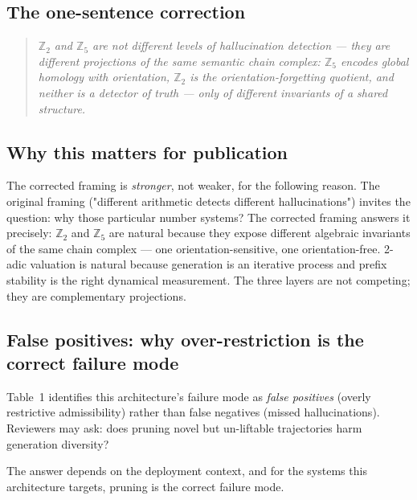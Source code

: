 \documentclass[11pt,a4paper]{article}
\begin{document}
\subsection*{The one-sentence correction}

\begin{quote}
\emph{$\mathbb{Z}_2$ and $\mathbb{Z}_5$ are not different levels of
hallucination detection --- they are different projections of the same
semantic chain complex: $\mathbb{Z}_5$ encodes global homology with
orientation, $\mathbb{Z}_2$ is the orientation-forgetting quotient, and
neither is a detector of truth --- only of different invariants of a
shared structure.}
\end{quote}

\subsection*{Why this matters for publication}

The corrected framing is \emph{stronger}, not weaker, for the following reason.
The original framing ("different arithmetic detects different hallucinations")
invites the question: why those particular number systems?
The corrected framing answers it precisely: $\mathbb{Z}_2$ and $\mathbb{Z}_5$
are natural because they expose different algebraic invariants of the same
chain complex --- one orientation-sensitive, one orientation-free.
2-adic valuation is natural because generation is an iterative process
and prefix stability is the right dynamical measurement.
The three layers are not competing; they are complementary projections.

\subsection{False positives: why over-restriction is the correct failure mode}

Table~1 identifies this architecture's failure mode as
\emph{false positives} (overly restrictive admissibility) rather than
false negatives (missed hallucinations).
Reviewers may ask: does pruning novel but un-liftable trajectories
harm generation diversity?

The answer depends on the deployment context, and for the systems
this architecture targets, pruning is the correct failure mode.
\end{document}
